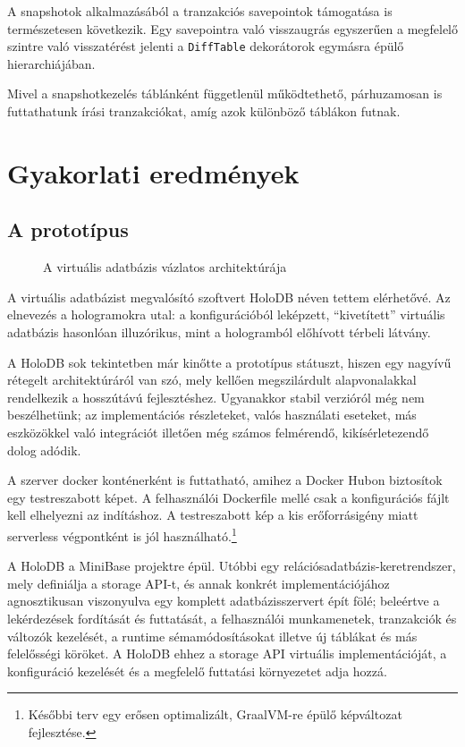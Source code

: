 \documentclass[
    parspace,
    noindent,
    nohyp,
]{elteiktdk}[2023/04/10]
\begin{document}
A snapshotok alkalmazásából a tranzakciós savepointok támogatása is természetesen következik.
Egy savepointra való visszaugrás egyszerűen a megfelelő szintre való visszatérést jelenti
a \texttt{DiffTable} dekorátorok egymásra épülő hierarchiájában.

Mivel a snapshotkezelés táblánként függetlenül működtethető,
párhuzamosan is futtathatunk írási tranzakciókat,
amíg azok különböző táblákon futnak.



\chapter{Gyakorlati eredmények}


\section{A prototípus}

\begin{figure}[H]
\centering

\caption{A virtuális adatbázis vázlatos architektúrája}
\end{figure}

A virtuális adatbázist megvalósító szoftvert HoloDB néven tettem elérhetővé.
Az elnevezés a hologramokra utal:
a konfigurációból leképzett, ``kivetített'' virtuális adatbázis hasonlóan illuzórikus,
mint a hologramból előhívott térbeli látvány.

A HoloDB sok tekintetben már kinőtte a prototípus státuszt,
hiszen egy nagyívű rétegelt architektúráról van szó,
mely kellően megszilárdult alapvonalakkal rendelkezik a hosszútávú fejlesztéshez.
Ugyanakkor stabil verzióról még nem beszélhetünk;
az implementációs részleteket, valós használati eseteket,
más eszközökkel való integrációt illetően még számos felmérendő, kikísérletezendő dolog adódik.

A szerver docker konténerként is futtatható, amihez a Docker Hubon biztosítok egy testreszabott képet.
A felhasználói Dockerfile mellé csak a konfigurációs fájlt kell elhelyezni az indításhoz.
A testreszabott kép a kis erőforrásigény miatt serverless végpontként is jól használható.\footnote{
    Későbbi terv egy erősen optimalizált, GraalVM-re épülő képváltozat fejlesztése.
}

A HoloDB a MiniBase projektre épül.
Utóbbi egy relációsadatbázis-keretrendszer, mely definiálja a storage API-t,
és annak konkrét implementációjához agnosztikusan viszonyulva
egy komplett adatbázisszervert épít fölé;
beleértve a lekérdezések fordítását és futtatását,
a felhasználói munkamenetek, tranzakciók és változók kezelését,
a runtime sémamódosításokat illetve új táblákat és más felelősségi köröket.
A HoloDB ehhez a storage API virtuális implementációját,
a konfiguráció kezelését
és a megfelelő futtatási környezetet adja hozzá.
\end{document}

